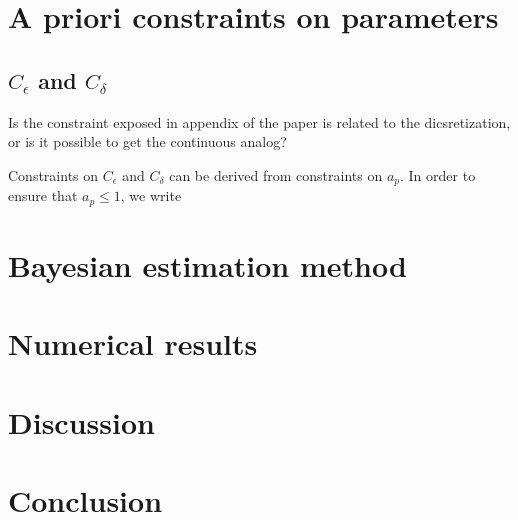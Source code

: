 \documentclass[draft]{agujournal2019}
\newcommand{\blu}[1]{{\color{BlueGreen} #1}}
\begin{document}
\section{A priori constraints on parameters}
%
\subsection{$C_\epsilon$ and $C_\delta$}

\blu{Is the constraint exposed in appendix of the paper is related to the dicsretization, or is it possible to get the continuous analog?}

Constraints on $C_\epsilon$ and $C_\delta$ can be derived from constraints on $a_p$. In order to ensure that $a_p \leq 1$, we write 


\section{Bayesian estimation method}

\section{Numerical results}

\section{Discussion}

\section{Conclusion}

%

\end{document}
